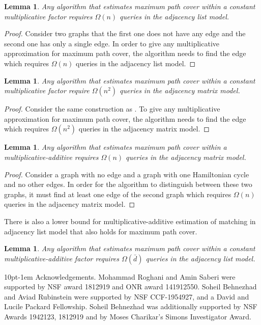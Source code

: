 \documentclass[letterpaper,11pt]{article}
\makeatletter
\newtheorem{lemma}[theorem]{Lemma}
\newenvironment{myproof}{
\vspace{-0.5cm}
\begin{proof}
}{
\end{proof}
}
\renewcommand{\paragraph}{%
  \@startsection{paragraph}{4}%
  {\z@}{10pt}{-1em}%
  {\normalfont\normalsize\bfseries}%
}
\makeatother
\begin{document}
\begin{lemma}\label{lem:hardness-adjacency-list}
Any algorithm that estimates maximum path cover within a constant multiplicative factor requires $\Omega(n)$ queries in the adjacency list model.
\end{lemma}
\begin{myproof}
Consider two graphs that the first one does not have any edge and the second one has only a single edge. In order to give any multiplicative approximation for maximum path cover, the algorithm needs to find the edge which requires $\Omega(n)$ queries in the adjacency list model. 
\end{myproof}

\begin{lemma}
Any algorithm that estimates maximum path cover within a constant multiplicative factor require $\Omega(n^2)$ queries in the adjacency matrix model.
\end{lemma}
\begin{myproof}
Consider the same construction as . To give any multiplicative approximation for maximum path cover, the algorithm needs to find the edge which requires $\Omega(n^2)$ queries in the adjacency matrix model. 
\end{myproof}


\begin{lemma}
Any algorithm that estimates maximum path cover within a multiplicative-additive  requires $\Omega(n)$ queries in the adjacency matrix model.
\end{lemma}
\begin{myproof}
Consider a graph with no edge and a graph with one Hamiltonian cycle and no other edges. In order for the algorithm to distinguish between these two graphs, it must find at least one edge of the second graph which requires $\Omega(n)$ queries in the adjacency matrix model. 
\end{myproof}

There is also a lower bound for multiplicative-additive estimation of matching in adjacency list model \cite{PARNAS2007183} that also holds for maximum path cover.

\begin{lemma}
Any algorithm that estimates maximum path cover within a constant multiplicative-additive factor requires $\Omega(\bar{d})$ queries in the adjacency list model.
\end{lemma}




\paragraph{Acknowledgements.} Mohammad Roghani and Amin Saberi were supported by NSF award 1812919 and ONR award 141912550. Soheil Behnezhad and Aviad Rubinstein were supported by NSF CCF-1954927, and a David and Lucile Packard Fellowship. Soheil Behnezhad was additionally supported by NSF Awards 1942123, 1812919 and by Moses Charikar's Simons Investigator Award.
\end{document}
